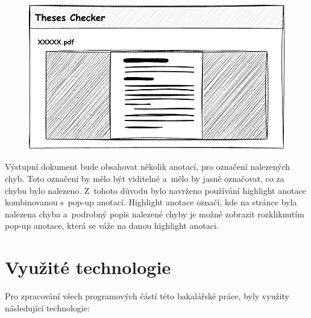 \begin{figure}[H]
    \label{pic_theses_checker_design_page2}
    \centering
    \includegraphics[width=0.8\linewidth]{obrazky-figures/Theses_Checker_design-page2.pdf}
    \caption{}
\end{figure}

Výstupní dokument bude obsahovat několik anotací, pro označení nalezených chyb.
Toto označení by mělo být viditelné a~mělo by jasně označovat, co za chybu bylo
nalezeno. Z~tohoto důvodu bylo navrženo používání highlight anotace kombinovanou
s~pop-up anotací. Highlight anotace označí, kde na stránce byla nalezena chyba
a~podrobný popis nalezené chyby je možné zobrazit rozkliknutím pop-up anotace,
která se váže na danou highlight anotaci.


\section{Využité technologie}
Pro zpracování všech programových částí této bakalářské práce, byly
využity následující technologie:

